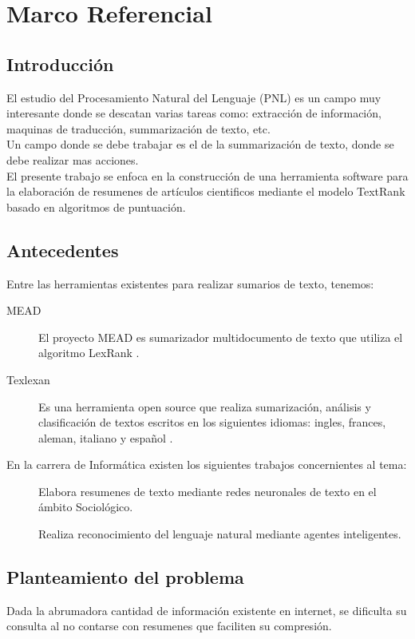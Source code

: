 \chapter{Marco Referencial}
\section{Introducci\'on}
El estudio del Procesamiento Natural del Lenguaje (PNL) es un campo muy interesante
donde se descatan varias tareas como: extracci\'on de informaci\'on, maquinas de
traducci\'on, summarizaci\'on de texto, etc. \\

Un campo donde se debe trabajar es el de la summarizaci\'on de texto, donde se debe
realizar mas acciones. \\

El presente trabajo se enfoca en la construcci\'on de una herramienta software para
la elaboraci\'on de resumenes de art\'iculos cientificos mediante el modelo TextRank
basado en algoritmos de puntuaci\'on.

\section{Antecedentes}
Entre las herramientas existentes para realizar sumarios de texto, tenemos:
\begin{description}
	\item[MEAD] El proyecto MEAD es sumarizador multidocumento de texto que utiliza
	el algoritmo LexRank \cite{MEAD}.
	\item[Texlexan] Es una herramienta open source que realiza sumarizaci\'on,
	an\'alisis y clasificaci\'on de textos escritos en los siguientes idiomas: ingles,
	frances, aleman, italiano y espa\~nol \cite{TEXLEXAN}.
\end{description}
En la carrera de Inform\'atica existen los siguientes trabajos concernientes al tema:\\
\begin{description}
	\item[\cite{EZ01}] Elabora resumenes de texto mediante redes neuronales de texto en el
	\'ambito Sociol\'ogico.
	\item[\cite{HM05}] Realiza reconocimiento del lenguaje natural mediante agentes
	inteligentes.
\end{description}


\section{Planteamiento del problema}
Dada la abrumadora cantidad de informaci\'on existente en internet, se dificulta su
consulta al no contarse con resumenes que faciliten su compresi\'on.

